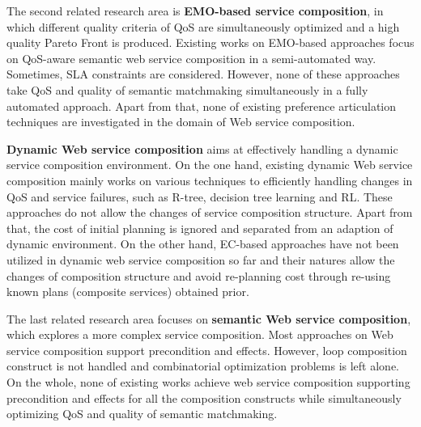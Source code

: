 
The second related research area is \textbf{EMO-based service composition}, in which different quality criteria of QoS are simultaneously optimized and a high quality Pareto Front is produced. Existing works on EMO-based approaches focus on QoS-aware semantic web service composition in a semi-automated way. Sometimes, SLA constraints are considered. However, none of these approaches take QoS and quality of semantic matchmaking simultaneously in a fully automated approach. Apart from that, none of existing preference articulation techniques are investigated in the domain of Web service composition.

\textbf{Dynamic Web service composition} aims at effectively handling a dynamic service composition environment. On the one hand, existing dynamic Web service composition mainly works on various techniques to efficiently handling changes in QoS and service failures, such as R-tree, decision tree learning and RL. These approaches do not allow the changes of service composition structure. Apart from that, the cost of initial planning is ignored and separated from an adaption of dynamic environment. On the other hand, EC-based approaches have not been utilized in dynamic web service composition so far and their natures allow the changes of composition structure and avoid re-planning cost through re-using known plans (composite services) obtained prior. 


The last related research area focuses on \textbf{semantic Web service composition}, which explores a more complex service composition. Most approaches on Web service composition support precondition and effects. However, loop composition construct is not handled and combinatorial optimization problems is left alone. On the whole, none of existing works achieve web service composition supporting precondition and effects for all the composition constructs while simultaneously  optimizing QoS and quality of semantic matchmaking.

